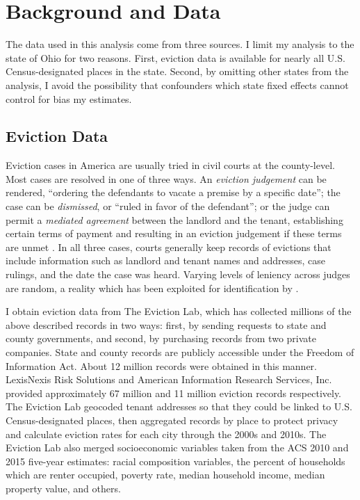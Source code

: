 \documentclass[12pt]{article}
\begin{document}
\section{Background and Data} \label{sec:data}
The data used in this analysis come from three sources. I limit my analysis to the state of Ohio for two reasons. First, eviction data is available for nearly all U.S. Census-designated places in the state. Second, by omitting other states from the analysis, I avoid the possibility that confounders which state fixed effects cannot control for bias my estimates.
\subsection{Eviction Data}
Eviction cases in America are usually tried in civil courts at the county-level. Most cases are resolved in one of three ways. An \textit{eviction judgement} can be rendered, ``ordering the defendants to vacate a premise by a specific date''; the case can be \textit{dismissed}, or ``ruled in favor of the defendant''; or the judge can permit a \textit{mediated agreement} between the landlord and the tenant, establishing certain terms of payment and resulting in an eviction judgement if these terms are unmet \citep{desmond_eviction_2018}. In all three cases, courts generally keep records of evictions that include information such as landlord and tenant names and addresses, case rulings, and the date the case was heard. Varying levels of leniency across judges are random, a reality which has been exploited for identification by \cite{humphries_does_2019}.

I obtain eviction data from The Eviction Lab, which has collected millions of the above described records in two ways: first, by sending requests to state and county governments, and second, by purchasing records from two private companies. State and county records are publicly accessible under the Freedom of Information Act. About 12 million records were obtained in this manner. LexisNexis Risk Solutions and American Information Research Services, Inc. provided approximately 67 million and 11 million eviction records respectively. The Eviction Lab geocoded tenant addresses so that they could be linked to U.S. Census-designated places, then aggregated records by place to protect privacy and calculate eviction rates for each city through the 2000s and 2010s. The Eviction Lab also merged socioeconomic variables taken from the ACS 2010 and 2015 five-year estimates: racial composition variables, the percent of households which are renter occupied, poverty rate, median household income, median property value, and others.
\end{document}
